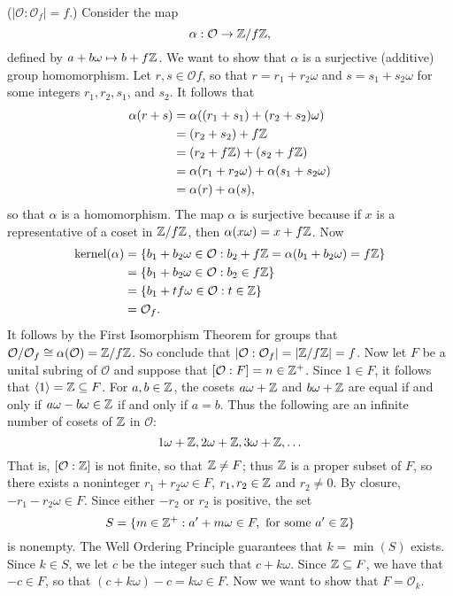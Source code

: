 \begin{enumerate}
      ($|\mathcal{O} :\mathcal{O}_f| = f$.) Consider the map
      $$\alpha : \mathcal{O} \rightarrow \mathbb{Z}/f\mathbb{Z},$$
      defined by $a + b\omega \mapsto b + f\mathbb{Z}$. We want to show that $\alpha$ is
      a surjective (additive) group homomorphism. Let $r,  s \in \mathcal{O}f$, 
      so that $r = r_1 + r_2\omega$ and $s = s_1 + s_2\omega$ for some integers 
      $r_1, r_2, s_1$, and $s_2$. It follows that
      \begin{align*}
         \alpha(r + s) &= \alpha((r_1 + s_1) + (r_2 + s_2)\omega) \\
            &= (r_2 + s_2) + f\mathbb{Z} \\
            &= (r_2 + f\mathbb{Z}) + (s_2 + f\mathbb{Z}) \\
            &= \alpha(r_1 + r_2\omega) + \alpha(s_1 + s_2\omega) \\
            &= \alpha(r) + \alpha(s),
      \end{align*}
      so that $\alpha$ is a homomorphism. The map $\alpha$ is surjective because
      if $x$ is a representative of a coset in $\mathbb{Z}/f\mathbb{Z}$, then
      $\alpha(x\omega) = x + f\mathbb{Z}$. Now
      \begin{align*}
         \text{kernel}(\alpha) &= \{b_1 + b_2\omega \in \mathcal{O} :
            b_2 + f\mathbb{Z} = \alpha(b_1 + b_2\omega) = f\mathbb{Z}\} \\
            &= \{b_1 + b_2\omega \in \mathcal{O} : b_2 \in f\mathbb{Z}\} \\
            &= \{b_1 + tf\omega \in \mathcal{O} : t \in \mathbb{Z}\} \\
            &= \mathcal{O}_f.
      \end{align*}
      It follows by the First Isomorphism Theorem for groups that
      $\mathcal{O}/\mathcal{O}_f \cong \alpha(\mathcal{O}) = \mathbb{Z}/f\mathbb{Z}$. So 
      conclude that $|\mathcal{O} : \mathcal{O}_f| = |\mathbb{Z}/f\mathbb{Z}| = f$. Now let $F$
      be a unital subring of $\mathcal{O}$ and suppose that
      $[\mathcal{O} : F] = n \in \mathbb{Z}^+$. Since $1 \in F$, it follows that
      $\langle 1 \rangle = \mathbb{Z} \subseteq F$. For $a, b \in \mathbb{Z}$, the cosets $a\omega + \mathbb{Z}$ 
      and $b\omega + \mathbb{Z}$ are equal if and only if $a\omega - b\omega \in \mathbb{Z}$ if 
      and only if $a = b$. Thus the following are an infinite number of cosets
      of $\mathbb{Z}$ in $\mathcal{O}$:
      $$1\omega + \mathbb{Z}, 2\omega + \mathbb{Z}, 3\omega + \mathbb{Z}, \ldots$$
      That is, $[\mathcal{O} : \mathbb{Z}]$ is not finite, so that $\mathbb{Z} \neq F$; thus
      $\mathbb{Z}$ is a proper subset of $F$, so there exists a noninteger
      $r_1 + r_2\omega\in F$, $r_1, r_2 \in \mathbb{Z}$ and $r_2 \neq 0$. By closure,
      $-r_1 - r_2\omega \in F$. Since either $-r_2$ or $r_2$ is positive, the
      set
      $$S = \{m \in \mathbb{Z}^+ : a' + m\omega \in F, \text{ for some }a' \in \mathbb{Z}\}$$
      is nonempty. The Well Ordering Principle guarantees that $k = \min(S)$
      exists. Since $k \in S$, we let $c$ be the integer such that
      $c + k\omega$. Since $\mathbb{Z} \subseteq F$, we have that $-c \in F$, so that
      $(c + k\omega) - c = k\omega \in F$. Now we want to show that
      $F = \mathcal{O}_k$.


\end{enumerate}

